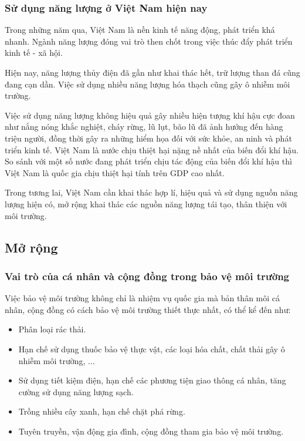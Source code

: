 \subsubsection{Sử dụng năng lượng ở Việt Nam hiện nay}
Trong những năm qua, Việt Nam là nền kinh tế năng động, phát triển khá nhanh. Ngành năng lượng đóng vai trò then chốt trong việc thúc đẩy phát triển kinh tế - xã hội.

Hiện nay, năng lượng thủy điện đã gần như khai thác hết, trữ lượng than đá cũng đang cạn dần. Việc sử dụng nhiều năng lượng hóa thạch cũng gây ô nhiễm môi trường.

Việc sử dụng năng lượng không hiệu quả gây nhiều hiện tượng khí hậu cực đoan như nắng nóng khắc nghiệt, cháy rừng, lũ lụt, bão lũ đã ảnh hưởng đến hàng triệu người, đồng thời gây ra những hiểm họa đối với sức khỏe, an ninh và phát triển kinh tế. Việt Nam là nước chịu thiệt hại nặng nề nhất của biến đổi khí hậu. So sánh với một số nước đang phát triển chịu tác động của biến đổi khí hậu thì Việt Nam là quốc gia chịu thiệt hại tính trên GDP cao nhất.

Trong tương lai, Việt Nam cần khai thác hợp lí, hiệu quả và sử dụng nguồn năng lượng hiện có, mở rộng khai thác các nguồn năng lượng tái tạo, thân thiện với môi trường.


\subsection{Mở rộng}
\subsubsection{Vai trò của cá nhân và cộng đồng trong bảo vệ môi trường}
Việc bảo vệ môi trường không chỉ là nhiệm vụ quốc gia mà bản thân môi cá nhân, cộng đồng có cách bảo vệ môi trường thiết thực nhất, có thể kể đến như:
\begin{itemize}
	\item Phân loại rác thải.
	\item Hạn chế sử dụng thuốc bảo vệ thực vật, các loại hóa chất, chất thải gây ô nhiễm môi trường, $\ldots$
	\item Sử dụng tiết kiệm điện, hạn chế các phương tiện giao thông cá nhân, tăng cường sử dụng năng lượng sạch.
	\item Trồng nhiều cây xanh, hạn chế chặt phá rừng.
	\item Tuyên truyền, vận động gia đình, cộng đồng tham gia bảo vệ môi trường.
\end{itemize}

